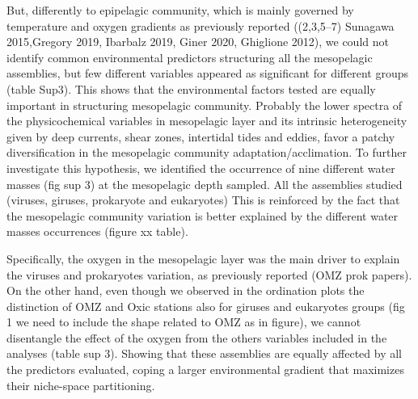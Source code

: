 \documentclass[fleqn,10pt]{wlscirep}
\begin{document}
But, differently to epipelagic community, which is mainly governed by temperature and oxygen gradients as previously reported ((2,3,5–7) Sunagawa 2015,Gregory 2019, Ibarbalz 2019, Giner 2020, Ghiglione 2012), we could not identify common environmental predictors structuring all the mesopelagic assemblies, but few different variables appeared as significant for different groups (table Sup3). This shows that the environmental factors tested are equally important in structuring mesopelagic community. Probably the lower spectra of the physicochemical variables in mesopelagic layer and its intrinsic heterogeneity given by deep currents, shear zones, intertidal tides and eddies, favor a patchy diversification in the mesopelagic community adaptation/acclimation. To further investigate this hypothesis, we identified the occurrence of nine different water masses (fig sup 3) at the mesopelagic depth sampled. All the assemblies studied (viruses, giruses, prokaryote and eukaryotes) This is reinforced by the fact that the mesopelagic community variation is better explained by the different water masses occurrences (figure xx table).

Specifically, the oxygen in the mesopelagic layer was the main driver to explain the viruses and prokaryotes variation, as previously reported (OMZ prok papers). On the other hand, even though we observed in the ordination plots  the distinction of OMZ and Oxic stations also for giruses and eukaryotes groups (fig 1 we need to include the shape related to OMZ as in figure), we cannot disentangle the effect of the oxygen from the others variables included in the analyses (table sup 3). Showing that these assemblies are equally affected by all the predictors evaluated, coping a larger environmental gradient that maximizes their niche-space partitioning.
\end{document}
